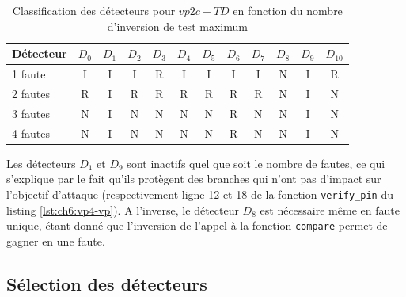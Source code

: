             \begin{table}[H]
            \centering
                \begin{tabular}{|l|c|c|c|c|c|c|c|c|c|c|c|}
                \hline
                \rowcolor[HTML]{EFEFEF} 
                Détecteur & $D_0$ & $D_1$ & $D_2$ & $D_3$ & $D_4$ & $D_5$ & $D_6$ & $D_7$ & $D_8$ & $D_9$ & $D_{10}$ \\ \hline
                \rowcolor[HTML]{FFCCC9} 
                \cellcolor[HTML]{EFEFEF}1 faute & I & I & I & \cellcolor[HTML]{FFCC67}R & I & I & I & I & \cellcolor[HTML]{9AFF99}N & I & \cellcolor[HTML]{FFCC67}R \\ \hline
                \rowcolor[HTML]{FFCC67} 
                \cellcolor[HTML]{EFEFEF}2 fautes & R & \cellcolor[HTML]{FFCCC9}I & R & R & R & R & R & R & \cellcolor[HTML]{9AFF99}N & \cellcolor[HTML]{FFCCC9}I & \cellcolor[HTML]{9AFF99}N \\ \hline
                \rowcolor[HTML]{9AFF99} 
                \cellcolor[HTML]{EFEFEF}3 fautes & N & \cellcolor[HTML]{FFCCC9}I & N & N & N & N & \cellcolor[HTML]{FFCC67}R & N & N & \cellcolor[HTML]{FFCCC9}I & N \\ \hline
                \rowcolor[HTML]{9AFF99} 
                \cellcolor[HTML]{EFEFEF}4 fautes & N & \cellcolor[HTML]{FFCCC9}I & N & N & N & N & \cellcolor[HTML]{FFCC67}R & N & N & \cellcolor[HTML]{FFCCC9}I & N \\ \hline
                \end{tabular}
            \caption{Classification des détecteurs pour $vp2c+TD$ en fonction du nombre d'inversion de test maximum}
            \label{tbl:vp-td-ccpa-classification}
            \end{table}
                
            Les détecteurs $D_1$ et $D_9$ sont inactifs quel que soit le nombre de fautes, ce qui s'explique par le fait qu'ils protègent des branches qui n'ont pas d'impact sur l'objectif d'attaque (respectivement ligne 12 et 18 de la fonction \texttt{verify\_pin} du listing \ref{lst:ch6:vp4-vp}). A l'inverse, le détecteur $D_8$ est nécessaire même en faute unique, étant donné que l'inversion de l'appel à la fonction \texttt{compare} permet de gagner en une faute.
            
        \subsection{Sélection des détecteurs}
        \label{sec:ch6:selection} 

